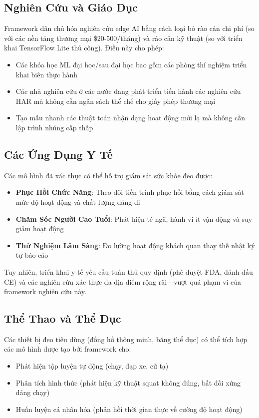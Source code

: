 \subsection{Nghiên Cứu và Giáo Dục}
Framework dân chủ hóa nghiên cứu edge AI bằng cách loại bỏ rào cản chi phí (so với các nền tảng thương mại \$20-500/tháng) và rào cản kỹ thuật (so với triển khai TensorFlow Lite thủ công). Điều này cho phép:
\begin{itemize}
    \item Các khóa học ML đại học/sau đại học bao gồm các phòng thí nghiệm triển khai biên thực hành
    \item Các nhà nghiên cứu ở các nước đang phát triển tiến hành các nghiên cứu HAR mà không cần ngân sách thể chế cho giấy phép thương mại
    \item Tạo mẫu nhanh các thuật toán nhận dạng hoạt động mới lạ mà không cần lập trình nhúng cấp thấp
\end{itemize}

\subsection{Các Ứng Dụng Y Tế}
Các mô hình đã xác thực có thể hỗ trợ giám sát sức khỏe đeo được:
\begin{itemize}
    \item \textbf{Phục Hồi Chức Năng}: Theo dõi tiến trình phục hồi bằng cách giám sát mức độ hoạt động và chất lượng dáng đi
    \item \textbf{Chăm Sóc Người Cao Tuổi}: Phát hiện té ngã, hành vi ít vận động và suy giảm hoạt động
    \item \textbf{Thử Nghiệm Lâm Sàng}: Đo lường hoạt động khách quan thay thế nhật ký tự báo cáo
\end{itemize}

Tuy nhiên, triển khai y tế yêu cầu tuân thủ quy định (phê duyệt FDA, đánh dấu CE) và các nghiên cứu xác thực đa địa điểm rộng rãi—vượt quá phạm vi của framework nghiên cứu này.

\subsection{Thể Thao và Thể Dục}
Các thiết bị đeo tiêu dùng (đồng hồ thông minh, băng thể dục) có thể tích hợp các mô hình được tạo bởi framework cho:
\begin{itemize}
    \item Phát hiện tập luyện tự động (chạy, đạp xe, cử tạ)
    \item Phân tích hình thức (phát hiện kỹ thuật squat không đúng, bất đối xứng dáng chạy)
    \item Huấn luyện cá nhân hóa (phản hồi thời gian thực về cường độ hoạt động)
\end{itemize}

